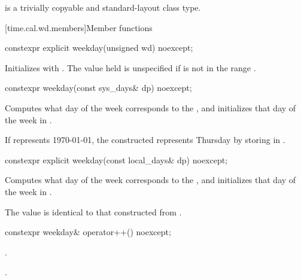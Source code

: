 \pnum
{} is a trivially copyable and standard-layout class type.

[time.cal.wd.members]{Member functions}

%
\begin{itemdecl}
constexpr explicit weekday(unsigned wd) noexcept;
\end{itemdecl}

\begin{itemdescr}
\pnum
\effects
Initializes  with .
The value held is unspecified if  is not in the range .
\end{itemdescr}

%
\begin{itemdecl}
constexpr weekday(const sys_days& dp) noexcept;
\end{itemdecl}

\begin{itemdescr}
\pnum
\effects
Computes what day of the week corresponds to the  ,
and initializes that day of the week in .

\pnum
\begin{example}
If  represents 1970-01-01,
the constructed  represents Thursday
by storing  in .
\end{example}
\end{itemdescr}

%
\begin{itemdecl}
constexpr explicit weekday(const local_days& dp) noexcept;
\end{itemdecl}

\begin{itemdescr}
\pnum
\effects
Computes what day of the week corresponds to the  ,
and initializes that day of the week in .

\pnum
\ensures
The value is identical to that constructed from
.
\end{itemdescr}

%
\begin{itemdecl}
constexpr weekday& operator++() noexcept;
\end{itemdecl}

\begin{itemdescr}
\pnum
\effects
{}.

\pnum
\returns
{}.
\end{itemdescr}

